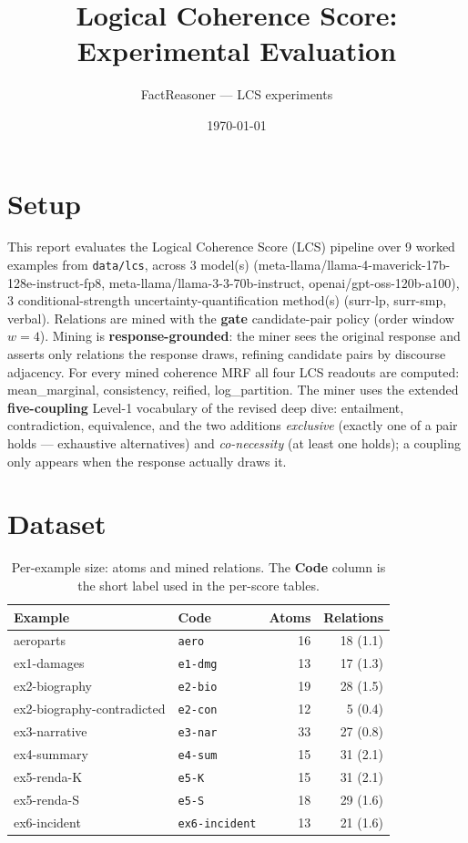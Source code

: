 \documentclass[11pt]{article}
\title{Logical Coherence Score: Experimental Evaluation}
\author{FactReasoner --- LCS experiments}
\date{\today}
\begin{document}
\maketitle

\section{Setup}

This report evaluates the Logical Coherence Score (LCS) pipeline over 9 worked examples from \texttt{data/lcs}, across 3 model(s) (meta-llama/llama-4-maverick-17b-128e-instruct-fp8, meta-llama/llama-3-3-70b-instruct, openai/gpt-oss-120b-a100), 3 conditional-strength uncertainty-quantification method(s) (surr-lp, surr-smp, verbal). Relations are mined with the \textbf{gate} candidate-pair policy (order window $w=4$). Mining is \textbf{response-grounded}: the miner sees the original response and asserts only relations the response draws, refining candidate pairs by discourse adjacency. For every mined coherence MRF all four LCS readouts are computed: mean\_marginal, consistency, reified, log\_partition. The miner uses the extended \textbf{five-coupling} Level-1 vocabulary of the revised deep dive: entailment, contradiction, equivalence, and the two additions \emph{exclusive} (exactly one of a pair holds --- exhaustive alternatives) and \emph{co-necessity} (at least one holds); a coupling only appears when the response actually draws it. 

\section{Dataset}

\begin{table}[htbp]
\centering
\small
\caption{Per-example size: atoms and mined relations. The \textbf{Code} column is the short label used in the per-score tables.}
\label{tab:coverage}
\begin{tabular}{llrr}
\toprule
Example & Code & Atoms & Relations \\
\midrule
aeroparts & \texttt{aero} & 16 & 18 (1.1) \\
ex1-damages & \texttt{e1-dmg} & 13 & 17 (1.3) \\
ex2-biography & \texttt{e2-bio} & 19 & 28 (1.5) \\
ex2-biography-contradicted & \texttt{e2-con} & 12 & 5 (0.4) \\
ex3-narrative & \texttt{e3-nar} & 33 & 27 (0.8) \\
ex4-summary & \texttt{e4-sum} & 15 & 31 (2.1) \\
ex5-renda-K & \texttt{e5-K} & 15 & 31 (2.1) \\
ex5-renda-S & \texttt{e5-S} & 18 & 29 (1.6) \\
ex6-incident & \texttt{ex6-incident} & 13 & 21 (1.6) \\
\bottomrule
\end{tabular}
\end{table}
\end{document}
